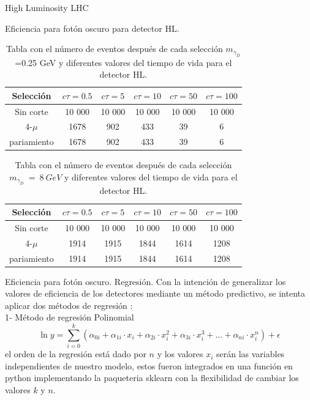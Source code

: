 \begin{frame}{}
    \begin{center}
        \LARGE High Luminosity LHC
    \end{center}
\end{frame}


\begin{frame}{Eficiencia para fot\'on oscuro para detector HL.}
\begin{small}
\begin{table}[]
\centering
\begin{tabular}{c|c|c|c|c|c|}
Selecci\'on  & $c\tau=0.5$ & $c\tau=5$ & $c\tau=10$ & $c\tau=50$ & $c\tau=100$ \\  \hline
Sin corte    &  10 000 & 10 000 & 10 000 & 10 000 & 10 000\\
4-$\mu$      &  1678 & 902 & 433 & 39 & 6 \\
pariamiento  &  1678 & 902 & 433 & 39 & 6
\end{tabular}
\caption{Tabla con el n\'umero de eventos despu\'es de cada selecci\'on $m_{\gamma_{D}}$=0.25 GeV y diferentes valores del tiempo de vida para el detector HL.}
\end{table}

\begin{table}[h]
\centering
\begin{tabular}{c|c|c|c|c|c|}
Selecci\'on  & $c\tau=0.5$ & $c\tau=5$ & $c\tau=10$ & $c\tau=50$ & $c\tau=100$ \\ \hline
Sin corte   & 10 000 & 10 000 & 10 000 & 10 000 & 10 000\\
4-$\mu$     & 1914 & 1915 & 1844 & 1614 & 1208 \\
pariamiento & 1914 & 1915 & 1844 & 1614 & 1208
\end{tabular}
\caption{Tabla con el n\'umero de eventos despu\'es de cada selecci\'on $m_{\gamma_{D}}~=~ 8~GeV$ y diferentes valores del tiempo de vida para el detector HL.}
\end{table}
\end{small}
\end{frame}

\begin{frame}{Eficiencia para fot\'on oscuro. Regresi\'on.}
Con la intenci\'on de generalizar los valores de eficiencia de los detectores  mediante un m\'etodo predictivo, se intenta aplicar dos m\'etodos de regresi\'on : \\
1- M\'etodo de regresi\'on Polinomial
\begin{equation}
\ln y = \sum_{i=0}^k (\alpha_{0i} + \alpha_{1i}\cdot x_i + \alpha_{2i}\cdot x_i^2 + \alpha_{3i}\cdot x_i^3 + \ldots+\alpha_{ni} \cdot x_i^n)+\epsilon
\end{equation}
el orden de la regresi\'on est\'a dado por $n$ y los valores $x_i$ ser\'an las variables independientes de nuestro modelo, estos fueron integrados en una funci\'on en python implementando la paqueteria sklearn con la flexibilidad de cambiar los valores $k$ y $n$.

\end{frame}

